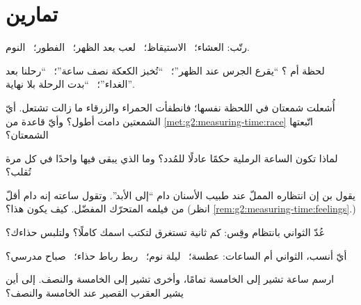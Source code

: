 \section{تمارين}

\begin{exercise}[$\star$]\label{exo:g2:measuring-time:1}
رتّب: العشاء؛ \ الاستيقاظ؛ \ لعب بعد الظهر؛ \ الفطور؛
\ النوم.
\end{exercise}

\begin{exercise}[$\star$]\label{exo:g2:measuring-time:2}
لحظة أم ؟ ``يقرع الجرس عند الظهر''؛ \ ``تُخبز الكعكة نصف
ساعة''؛ \ ``رحلنا بعد الغداء''؛ \ ``بدت الرحلة بلا نهاية''.
\end{exercise}

\begin{exercise}[$\star$]\label{exo:g2:measuring-time:3}
أُشعلت شمعتان في اللحظة نفسها؛ فانطفأت الحمراء والزرقاء ما زالت
تشتعل. أيّ الشمعتين دامت أطول؟ وأيّ قاعدة من
\cref{met:g2:measuring-time:race} اتّبعتها الشمعتان؟
\end{exercise}

\begin{exercise}[$\star$]\label{exo:g2:measuring-time:4}
لماذا تكون الساعة الرملية حكمًا عادلًا للمُدد؟ وما الذي يبقى
فيها واحدًا في كل مرة تُقلب؟
\end{exercise}

\begin{exercise}[$\star$]\label{exo:g2:measuring-time:5}
يقول بن إن انتظاره المملّ عند طبيب الأسنان دام ``إلى الأبد''.
وتقول ساعته إنه دام أقلّ من فيلمه المتحرّك المفضّل. كيف يكون
هذا؟ (انظر \cref{rem:g2:measuring-time:feelings}.)
\end{exercise}

\begin{exercise}[$\star$]\label{exo:g2:measuring-time:6}
عُدّ الثواني بانتظام وقِس: كم ثانية تستغرق لتكتب اسمك كاملًا؟
ولتلبس حذاءك؟
\end{exercise}

\begin{exercise}[$\star$]\label{exo:g2:measuring-time:7}
أيّ  أنسب، الثواني أم الساعات: عطسة؛ \ ليلة نوم؛ \ ربط رباط
حذاء؛ \ صباح مدرسي؟
\end{exercise}

\begin{exercise}[$\star$]\label{exo:g2:measuring-time:8}
ارسم ساعة تشير إلى الخامسة تمامًا، وأخرى تشير إلى الخامسة
والنصف. إلى أين يشير العقرب القصير عند الخامسة والنصف؟
\end{exercise}

